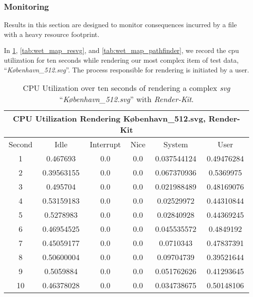 \subsubsection{Monitoring}\label{sec:results_monitoring}
Results in this section are designed to monitor consequences incurred by a file with a heavy resource footprint.\medskip

In \cref{tab:wet_map_renderkit}, \cref{tab:wet_map_resvg}, and \cref{tab:wet_map_pathfinder}, we record the cpu utilization for ten seconds while rendering our most complex item of test data, ``\textit{København\_512.svg}''. The process responsible for rendering is initiated by a user.\medskip

\begin{table}[H]
\centering
\begin{tabular}{ |c|c|c|c|c|c| }
\hline
\multicolumn{6}{|c|}{CPU Utilization Rendering København\_512.svg, Render-Kit}\\
\hline
Second&Idle&Interrupt&Nice&System&User\\
\hline
1&0.467693&0.0&0.0&0.037544124&0.49476284\\
\hline
2&0.39563155&0.0&0.0&0.067370936&0.5369975\\
\hline
3&0.495704&0.0&0.0&0.021988489&0.48169076\\
\hline
4&0.53159183&0.0&0.0&0.02529972&0.44310844\\
\hline
5&0.5278983&0.0&0.0&0.02840928&0.44369245\\
\hline
6&0.46954525&0.0&0.0&0.045535572&0.4849192\\
\hline
7&0.45059177&0.0&0.0&0.0710343&0.47837391\\
\hline
8&0.50600004&0.0&0.0&0.09704739&0.39521644\\
\hline
9&0.5059884&0.0&0.0&0.051762626&0.41293645\\
\hline
10&0.46378028&0.0&0.0&0.034738675&0.50148106\\
\hline
\end{tabular}
\caption{CPU Utilization over ten seconds of rendering a complex \textit{svg} ``\textit{København\_512.svg}'' with \textit{Render-Kit}.\label{tab:wet_map_renderkit}}
\end{table}
\medskip

